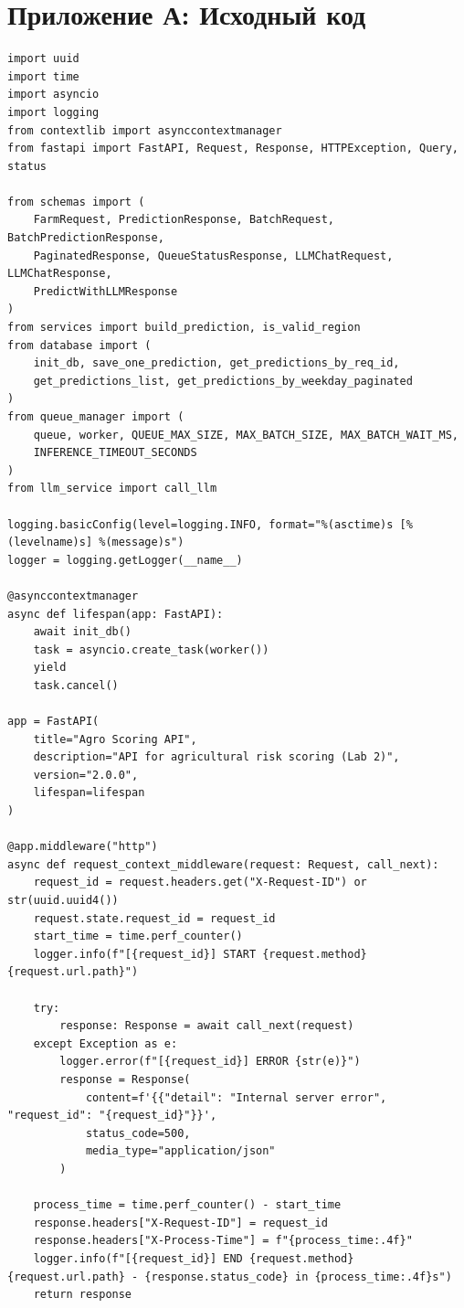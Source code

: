 \documentclass[12pt,a4paper]{article}
\begin{document}
\section*{Приложение А: Исходный код}

\begin{lstlisting}[caption={main.py}]
import uuid
import time
import asyncio
import logging
from contextlib import asynccontextmanager
from fastapi import FastAPI, Request, Response, HTTPException, Query, status

from schemas import (
    FarmRequest, PredictionResponse, BatchRequest, BatchPredictionResponse,
    PaginatedResponse, QueueStatusResponse, LLMChatRequest, LLMChatResponse,
    PredictWithLLMResponse
)
from services import build_prediction, is_valid_region
from database import (
    init_db, save_one_prediction, get_predictions_by_req_id,
    get_predictions_list, get_predictions_by_weekday_paginated
)
from queue_manager import (
    queue, worker, QUEUE_MAX_SIZE, MAX_BATCH_SIZE, MAX_BATCH_WAIT_MS,
    INFERENCE_TIMEOUT_SECONDS
)
from llm_service import call_llm

logging.basicConfig(level=logging.INFO, format="%(asctime)s [%(levelname)s] %(message)s")
logger = logging.getLogger(__name__)

@asynccontextmanager
async def lifespan(app: FastAPI):
    await init_db()
    task = asyncio.create_task(worker())
    yield
    task.cancel()

app = FastAPI(
    title="Agro Scoring API",
    description="API for agricultural risk scoring (Lab 2)",
    version="2.0.0",
    lifespan=lifespan
)

@app.middleware("http")
async def request_context_middleware(request: Request, call_next):
    request_id = request.headers.get("X-Request-ID") or str(uuid.uuid4())
    request.state.request_id = request_id
    start_time = time.perf_counter()
    logger.info(f"[{request_id}] START {request.method} {request.url.path}")

    try:
        response: Response = await call_next(request)
    except Exception as e:
        logger.error(f"[{request_id}] ERROR {str(e)}")
        response = Response(
            content=f'{{"detail": "Internal server error", "request_id": "{request_id}"}}',
            status_code=500,
            media_type="application/json"
        )

    process_time = time.perf_counter() - start_time
    response.headers["X-Request-ID"] = request_id
    response.headers["X-Process-Time"] = f"{process_time:.4f}"
    logger.info(f"[{request_id}] END {request.method} {request.url.path} - {response.status_code} in {process_time:.4f}s")
    return response


\end{lstlisting}
\end{document}

